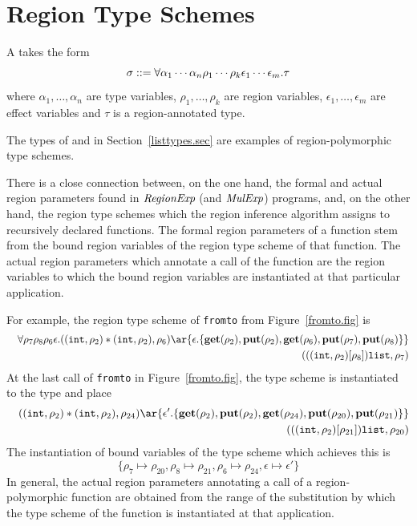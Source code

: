 \documentclass[12pt]{book}
\begin{document}
\section{Region Type Schemes}
\label{regtych.sec}
A  takes the form
$$\sigma::=\forall\alpha_1\cdots\alpha_n\rho_1\cdots\rho_k\epsilon_1\cdots\epsilon_m.\tau$$
where $\alpha_1,\ldots,\alpha_n$ are type variables,
$\rho_1,\ldots,\rho_k$ are region variables,
$\epsilon_1,\ldots,\epsilon_m$ are effect variables
and $\tau$ is a region-annotated type.

The types of  and \boxml{::} in Section~\ref{listtypes.sec} are examples of 
region-polymorphic type schemes. 

There is a close connection between, on the one hand, the formal and
actual region parameters found in $\hbox{\it RegionExp}$
(and $\hbox{\it MulExp}$) programs, and, on the other hand, the region type schemes which the region inference algorithm
assigns to recursively declared functions. The formal region
parameters of a function stem from the bound region variables of the
region type scheme of that function.  The actual region parameters which
annotate a call of the function are the region variables to which the bound
region variables are instantiated at that particular application.

For example, the region type scheme of {\tt fromto} from Figure~\ref{fromto.fig} is
\begin{eqnarray*}
&&\forall\rho_7\rho_8\rho_6\epsilon.((\boxml{int},\rho_2)\ast(\boxml{int},\rho_2),\rho_6)\ar{\epsilon.\{
\Get(\rho_2),\Put(\rho_2),\Get(\rho_6),\Put(\rho_7),\Put(\rho_8)\}}\\
&&\qquad (((\boxml{int},\rho_2)[\rho_8])\boxml{list},\rho_7)
\end{eqnarray*}
At the last call of {\tt fromto} in Figure~\ref{fromto.fig},
the type scheme is instantiated to the type and place
\begin{eqnarray*}
&&((\boxml{int},\rho_2)\ast(\boxml{int},\rho_2),\rho_{24})\ar{\epsilon'.\{
\Get(\rho_2),\Put(\rho_2),\Get(\rho_{24}),\Put(\rho_{20}),\Put(\rho_{21})\}}\\
&&\qquad (((\boxml{int},\rho_2)[\rho_{21}])\boxml{list},\rho_{20})
\end{eqnarray*}
The instantiation of bound variables of the type scheme which achieves this is
$$\{\rho_7\mapsto\rho_{20}, \rho_8\mapsto\rho_{21}, \rho_6\mapsto\rho_{24}, \epsilon\mapsto\epsilon'\}$$
In general, the actual region parameters annotating a call of a region-polymorphic function are obtained from
the range of the substitution by which the type scheme of the function is  instantiated at that
application.
\end{document}
